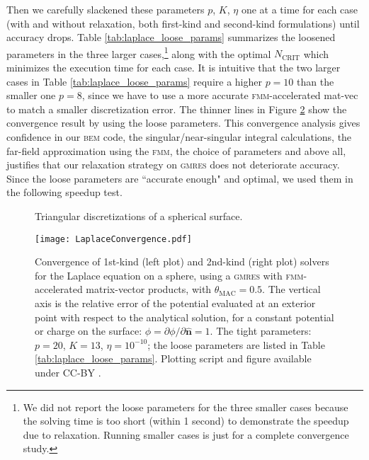 \documentclass[smallcondensed,final]{svjour3}
\newcommand{\bem}{\textsc{bem}\xspace}
\newcommand{\fmm}{\textsc{fmm}\xspace}
\newcommand{\ncrit}{N_{\text{CRIT}}}
\newcommand{\gmres}{\textsc{gmres}\xspace}
\newcommand{\partialdi}[2]{\partial #1 / \partial #2}
\newcommand{\nhat}{\hat{\mathbf{n}}}
\begin{document}
Then we carefully slackened these parameters $p$, $K$, $\eta$ one at a time for each case (with and without relaxation, both first-kind and second-kind formulations) until accuracy drops. Table \ref{tab:laplace_loose_params} summarizes the loosened parameters in the three larger cases,\footnote{We did not report the loose parameters for the three smaller cases because the solving time is too short (within 1 second) to demonstrate the speedup due to relaxation. Running smaller cases is just for a complete convergence study.} along with the optimal $\ncrit$ which minimizes the execution time for each case. It is intuitive that the two larger cases in Table \ref{tab:laplace_loose_params} require a higher $p=10$ than the smaller one $p=8$, since we have to use a more accurate \fmm-accelerated mat-vec to match a smaller discretization error. The thinner lines in Figure \ref{fig:laplaceconvergence} show the convergence result by using the loose parameters. This convergence analysis gives confidence in our \bem code, the singular/near-singular integral calculations, the far-field approximation using the \fmm, the choice of parameters and above all, justifies that our relaxation strategy on \gmres does not deteriorate accuracy. Since the loose parameters are ``accurate enough" and optimal, we used them in the following speedup test. 


\begin{figure}
\begin{center}
	\caption{Triangular discretizations of a spherical surface.}
	\label{fig:glob_spheres}
\end{center}
\end{figure}
%
\begin{figure}
\begin{center}
	\texttt{[image: LaplaceConvergence.pdf]}
	\caption{Convergence of 1st-kind (left plot) and 2nd-kind (right plot) solvers for the Laplace equation on a sphere, using a \gmres with \fmm-accelerated matrix-vector products, with $\theta_{\text{MAC}} = 0.5$. The vertical axis is the relative error of the potential evaluated at an exterior point with respect to the analytical solution, for a constant potential or charge on the surface: $\phi = \partialdi{\phi}{\nhat} = 1$. The tight parameters: $p=20$, $K=13$, $\eta=10^{-10}$; the loose parameters are listed in Table \ref{tab:laplace_loose_params}. Plotting script and figure available under CC-BY \cite{WangLaytonBarba2016-figshare2}.}
	\label{fig:laplaceconvergence}
\end{center}
\end{figure}
\end{document}
